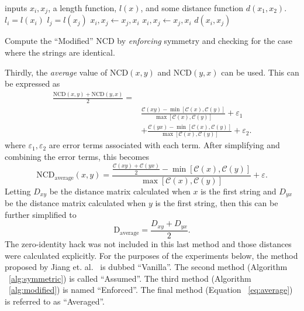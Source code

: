 \documentclass[conference]{IEEEtran}
\begin{document}
\begin{algorithm}
    \begin{algorithmic}
        \Require inputs $x_i, x_j$, a length function, $l(x)$, and some distance function $d(x_1,x_2)$.
         
            \State {}
        \Else  {}
            \State $l_i = l(x_i)$
            \State $l_j = l(x_j)$
                 \State $x_i, x_j \gets x_j, x_i$ 
                 
                     \State $x_i, x_j \gets x_j, x_i$ 
                \EndIf
            \EndIf
            \State \Return $d(x_i, x_j)$
        \EndIf
    \end{algorithmic}
    \caption{Compute the ``Modified'' NCD by \textit{enforcing} symmetry and checking for the case where the strings are identical.}
    \label{alg:modified}
\end{algorithm}

Thirdly, the \textit{average} value of NCD$(x,y)$ and NCD$(y,x)$ can be used. This can be expressed as
\begin{align*}
\frac{\text{NCD}(x,y) + \text{NCD}(y,x)}{2}= \\
    & \frac{\mathcal{C}(xy) - \min[\mathcal{C}(x), \mathcal{C}(y)]}{\max[\mathcal{C}(x), \mathcal{C}(y)]} + \varepsilon_1 \\
    &+  \frac{\mathcal{C}(yx) - \min[\mathcal{C}(x), \mathcal{C}(y)]}{\max[\mathcal{C}(x), \mathcal{C}(y)]} + \varepsilon_2.
\end{align*}
where $\varepsilon_1, \varepsilon_2$ are error terms associated with each term. 
After simplifying and combining the error terms, this becomes
\begin{equation}
    \text{NCD}_{\text{average}}(x, y) = \frac{\frac{\mathcal{C}(xy) + \mathcal{C}(yx)}{2} - \min[\mathcal{C}(x), \mathcal{C}(y)]}{\max[\mathcal{C}(x), \mathcal{C}(y)]} + \varepsilon.
\end{equation}
Letting $D_{xy}$ be the distance matrix calculated when $x$ is the first string and $D_{yx}$ be the distance matrix calculated when $y$ is the first string, then this can be further simplified to
\begin{equation}
    \text{D}_{\text{average}} = \frac{D_{xy}  + D_{yx}}{2}.
    \label{eq:average}
\end{equation}
The zero-identity hack was not included in this last method and those distances were calculated explicitly. 
For the purposes of the experiments below, the method proposed by Jiang et. al.~\cite{jiang2022less} is dubbed ``Vanilla''. 
The second method (Algorithm ~\ref{alg:symmetric}) is called ``Assumed''. 
The third method (Algorithm ~\ref{alg:modified}) is named ``Enforced''. 
The final method (Equation ~\ref{eq:average}) is referred to as ``Averaged''. 
\end{document}

